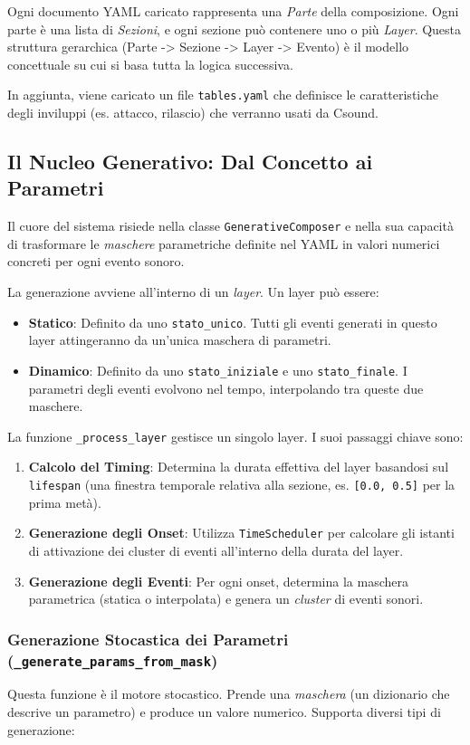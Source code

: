 Ogni documento YAML caricato rappresenta una \textit{Parte} della composizione. Ogni parte è una lista di \textit{Sezioni}, e ogni sezione può contenere uno o più \textit{Layer}. Questa struttura gerarchica (Parte -> Sezione -> Layer -> Evento) è il modello concettuale su cui si basa tutta la logica successiva.

In aggiunta, viene caricato un file \texttt{tables.yaml} che definisce le caratteristiche degli inviluppi (es. attacco, rilascio) che verranno usati da Csound.
\subsection{Il Nucleo Generativo: Dal Concetto ai Parametri}
Il cuore del sistema risiede nella classe \texttt{GenerativeComposer} e nella sua capacità di trasformare le \textit{maschere} parametriche definite nel YAML in valori numerici concreti per ogni evento sonoro.

La generazione avviene all'interno di un \textit{layer}. Un layer può essere:
\begin{itemize}
 \item \textbf{Statico}: Definito da uno \texttt{stato\_unico}. Tutti gli eventi generati in questo layer attingeranno da un'unica maschera di parametri.
 \item \textbf{Dinamico}: Definito da uno \texttt{stato\_iniziale} e uno \texttt{stato\_finale}. I parametri degli eventi evolvono nel tempo, interpolando tra queste due maschere.
\end{itemize}

La funzione \texttt{\_process\_layer} gestisce un singolo layer. I suoi passaggi chiave sono:
\begin{enumerate}
    \item \textbf{Calcolo del Timing}: Determina la durata effettiva del layer basandosi sul \texttt{lifespan} (una finestra temporale relativa alla sezione, es. \texttt{[0.0, 0.5]} per la prima metà).
    \item \textbf{Generazione degli Onset}: Utilizza \texttt{TimeScheduler} per calcolare gli istanti di attivazione dei cluster di eventi all'interno della durata del layer.
    \item \textbf{Generazione degli Eventi}: Per ogni onset, determina la maschera parametrica (statica o interpolata) e genera un \textit{cluster} di eventi sonori.
\end{enumerate}
\subsubsection{Generazione Stocastica dei Parametri (\texttt{\_generate\_params\_from\_mask})}
Questa funzione è il motore stocastico. Prende una \textit{maschera} (un dizionario che descrive un parametro) e produce un valore numerico. Supporta diversi tipi di generazione:

